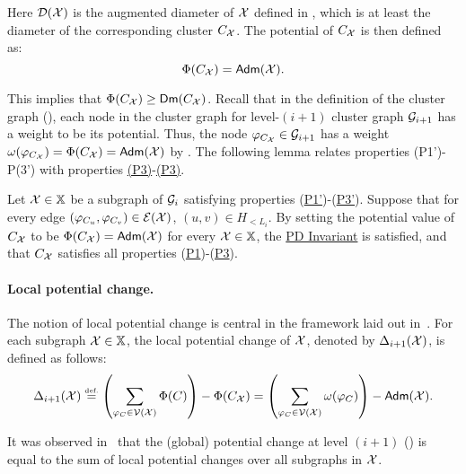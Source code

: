 Here $\mathcal{D}(\mathcal{X})$ is the augmented diameter of $\mathcal{X}$ defined in , which is at least the diameter of the corresponding cluster $C_{\mathcal{X}}$. The potential of  $C_{\mathcal{X}}$ is then defined as:
\begin{equation}\label{eq:SetPotential-i}
	\Phi(C_{\mathcal{X}}) = \mathsf{Adm}(\mathcal{X}).
\end{equation}

This implies that $\Phi(C_{\mathcal{X}})\geq \mathsf{Dm}(C_{\mathcal{X}})$. Recall that in the definition of the cluster graph (), each node in the cluster graph for level-$(i+1)$ cluster graph $\mathcal{G}_{i+1}$ has a weight to be its potential. Thus, the node $\varphi_{C_{\mathcal{X}}}\in \mathcal{G}_{i+1}$ has a weight $\omega(\varphi_{C_{\mathcal{X}}}) = \Phi(C_{\mathcal{X}}) = \mathsf{Adm}(\mathcal{X})$ by .  The following lemma relates properties (P1')-P(3') with properties \hyperlink{P1}{(P3)}-\hyperlink{P1}{(P3)}.

\begin{lemma}\label{lm:PropEquiv} Let $\mathcal{X} \in \mathbb{X}$ be a subgraph of $\mathcal{G}_i$ satisfying properties (\hyperlink{P1'}{P1'})-(\hyperlink{P3'}{P3'}). Suppose that for every edge $(\varphi_{C_u},\varphi_{C_v})\in \mathcal{E}(\mathcal{X})$, $(u,v) \in H_{<L_i}$.  By setting the potential value of $C_{\mathcal{X}}$ to be $\Phi(C_{\mathcal{X}}) = \mathsf{Adm}(\mathcal{X})$ for every $\mathcal{X} \in \mathbb{X}$, the \hyperlink{PD}{PD Invariant} is satisfied, and that  $C_{\mathcal{X}}$ satisfies all properties (\hyperlink{P1}{P1})-(\hyperlink{P3}{P3}).
\end{lemma}

\paragraph{Local potential change.~}  The notion of local potential change is central in the framework laid out in~\cite{LS21}. For each subgraph  $\mathcal{X} \in \mathbb{X}$, the local potential change of $\mathcal{X}$, denoted by $\Delta_{i+1}(\mathcal{X})$, is defined as follows:
\begin{equation}\label{eq:LocalPotential}
	\Delta_{i+1}(\mathcal{X}) \stackrel{\mbox{\tiny{def.}}}{=}   \left(\sum_{\varphi_C\in \mathcal{V}(\mathcal{X})} \Phi(C) \right) -  \Phi(C_{\mathcal{X}}) = \left(\sum_{\varphi_C\in \mathcal{V}(\mathcal{X})} \omega(\varphi_C) \right) - \mathsf{Adm}(\mathcal{X}). 
\end{equation} 

It was observed in~\cite{LS21} that the (global) potential change at level $(i+1)$ () is equal to the sum of local potential changes over all subgraphs in $\mathcal{X}$.


